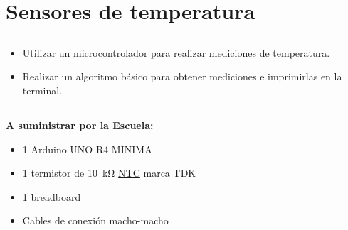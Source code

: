 \chapter{Sensores de temperatura}
\section{\obj}
\capacidad
\begin{itemize}
\item Utilizar un microcontrolador para realizar mediciones de temperatura.
\item Realizar un algoritmo básico para obtener mediciones e imprimirlas en la terminal.
\end{itemize}

\section{\mat}
\textbf{A suministrar por la Escuela:}
\begin{itemize}
\item 1 Arduino UNO R4 MINIMA
\item 1 termistor de \SI{10}{\kilo\ohm} \href{https://www.tdk-electronics.tdk.com/inf/50/db/ntc/NTC_Leaded_disks_K164.pdf}{NTC} marca TDK 
\item 1 breadboard
\item Cables de conexión macho-macho
\end{itemize}

